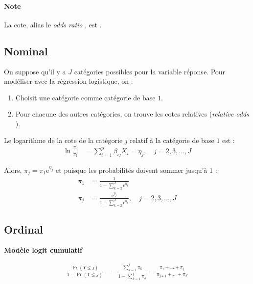\documentclass[french]{article}
\begin{document}
\begin{multicols*}{2}
\paragraph{Note}	La cote, alias le \og \textit{odds ratio} \fg{}, est .

\bigskip


\subsection{Nominal}
On suppose qu'il y a $J$ catégories possibles pour la variable réponse. 
Pour modéliser avec la régression logistique, on :
\begin{enumerate}[label	=	\circled{\arabic*}{lightgray}]
	\item	Choisit une catégorie comme catégorie de base $1$.
	\item	Pour chacune des autres catégories, on trouve les cotes relatives (\og \textit{relative odds} \fg{}).
\end{enumerate}

Le logarithme de la cote de la catégorie $j$ relatif à la catégorie de base $1$ est :
\begin{align*}
	\ln \frac{\pi_{j}}{\pi_{1}}
	&=	\sum_{i	=	1}^{p} \beta_{ij} X_{i}
	=	\eta_{j}, \quad j	=	2, 3, \dots, J
\end{align*}

Alors, $\pi_{j}	=	\pi_{1}\textrm{e}^{\eta_{j}}$ et puisque les probabilités doivent sommer jusqu'à 1 :
\begin{align*}
	\pi_{1}
	&=	\frac{1}{1 + \sum_{k	=	2}^{J} \textrm{e}^{\eta_{k}}}	\\
	\pi_{j}
	&=	\frac{\textrm{e}^{\eta_{j}}}{1 + \sum_{k	=	2}^{J} \textrm{e}^{\eta_{k}}}, \quad j	=	2, 3, \dots, J
\end{align*}



\subsection{Ordinal}
\textbf{Modèle logit cumulatif}

\begin{align*}
	\frac{\Pr(Y \leq j)}{1	-	\Pr(Y \leq j)}
	&=	\frac{\sum_{k	=	1}^{j} \pi_{k}}{1	-	\sum_{k	=	1}^{j} \pi_{k}}	
	=	\frac{\pi_{1} + \hdots + \pi_{j}}{\pi_{j + 1} + \hdots + \pi_{J}}	\\
\end{align*}


\end{multicols*}
\end{document}
